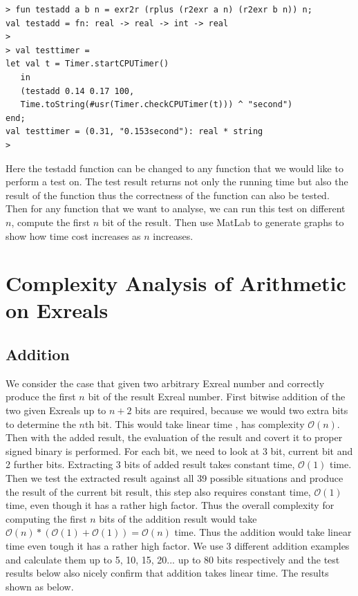 \documentclass[12pt,twoside,notitlepage]{report}
\begin{document}
{
\begin{verbatim}
> fun testadd a b n = exr2r (rplus (r2exr a n) (r2exr b n)) n;
val testadd = fn: real -> real -> int -> real
> 
> val testtimer = 
let val t = Timer.startCPUTimer()
   in
   (testadd 0.14 0.17 100, 
   Time.toString(#usr(Timer.checkCPUTimer(t))) ^ "second")
end;
val testtimer = (0.31, "0.153second"): real * string
> 
\end{verbatim}
}

Here the testadd function can be changed to any function that we would like to perform a test on. The test result returns not only the running time but also the result of the function thus the correctness of the function can also be tested. Then for any function that we want to analyse, we can run this test on different $n$, compute the first $n$ bit of the result. Then use MatLab to generate graphs to show how time cost increases as $n$ increases.

\section{Complexity Analysis of Arithmetic on Exreals}
\subsection {Addition}
We consider the case that given two arbitrary Exreal number and correctly produce the first $n$ bit of the result Exreal number. First bitwise addition of the two given Exreals up to $n+2$ bits are required, because we would two extra bits to determine the $n$th bit. This would take linear time , has complexity $\mathcal{O}(n)$. Then with the added result, the evaluation of the result and covert it to proper signed binary is performed. For each bit, we need to look at 3 bit, current bit and 2 further bits. Extracting 3 bits of added result takes constant time, $\mathcal{O}(1)$ time. Then we test the extracted result against all 39 possible situations and produce the result of the current bit result, this step also requires constant time, $\mathcal{O}(1)$ time, even though it has a rather high factor. Thus the overall complexity for computing the first $n$ bits of the addition result would take $\mathcal{O}(n) * (\mathcal{O}(1) + \mathcal{O}(1)) = \mathcal{O}(n)$ time. Thus the addition would take linear time even tough it has a rather high factor. We use 3 different addition examples and calculate them up to 5, 10, 15, 20... up to 80 bits respectively and the test results below also nicely confirm that addition takes linear time. The results shown as below.
\end{document}
